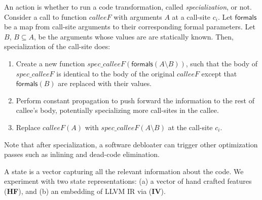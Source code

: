 An action is whether to run a code transformation, called
\emph{specialization}, or not. Consider a call to function $\mathit{calleeF}$
with arguments $A$ at a call-site $c_i$. Let $\mathsf{formals}$ be a map from
call-site arguments to their corresponding formal parameters. Let $B$, $B
\subseteq A$, be the arguments whose values are are statically known. Then,
specialization of the call-site does: 
\begin{enumerate}
\item Create a new function $spec\_calleeF(\mathsf{formals}(A \setminus B))$,
  such that the body of $spec\_calleeF$ is identical to the body of the original
  $calleeF$ except that $\mathsf{formals}(B)$ are replaced with their values.
  
\item Perform constant propagation to push forward the information to the
  rest of callee's body, potentially specializing more call-sites in
  the callee.
  
\item Replace $\mathit{calleeF}(A)$ with $spec\_calleeF(A \setminus B)$ at the
  call-site $c_i$.
\end{enumerate}

Note that after specialization, a software debloater
can trigger other optimization passes such as inlining and dead-code
elimination.

A state is a vector capturing
all the relevant information about the code. We experiment with two
state representations: (a)  a vector of hand crafted features (\textbf{\textbf{HF}}),
and (b) an embedding of LLVM IR via \insttovec (\textbf{\textbf{IV}}).

